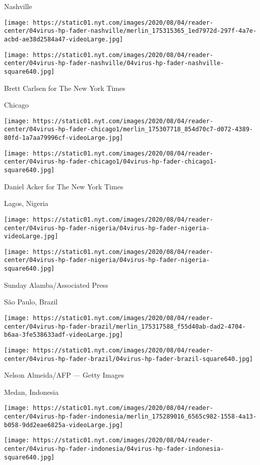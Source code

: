 \href{https://www.nytimes.com/2020/08/04/world/coronavirus-covid-19.html}{}

Nashville

\texttt{[image: https://static01.nyt.com/images/2020/08/04/reader-center/04virus-hp-fader-nashville/merlin\_175315365\_1ed7972d-297f-4a7e-acbd-ae38d2584a47-videoLarge.jpg]}

\texttt{[image: https://static01.nyt.com/images/2020/08/04/reader-center/04virus-hp-fader-nashville/04virus-hp-fader-nashville-square640.jpg]}

 Brett Carlsen for The New York Times

Chicago

\texttt{[image: https://static01.nyt.com/images/2020/08/04/reader-center/04virus-hp-fader-chicago1/merlin\_175307718\_854d70c7-d072-4389-80fd-1a7aa79996cf-videoLarge.jpg]}

\texttt{[image: https://static01.nyt.com/images/2020/08/04/reader-center/04virus-hp-fader-chicago1/04virus-hp-fader-chicago1-square640.jpg]}

 Daniel Acker for The New York Times

Lagos, Nigeria

\texttt{[image: https://static01.nyt.com/images/2020/08/04/reader-center/04virus-hp-fader-nigeria/04virus-hp-fader-nigeria-videoLarge.jpg]}

\texttt{[image: https://static01.nyt.com/images/2020/08/04/reader-center/04virus-hp-fader-nigeria/04virus-hp-fader-nigeria-square640.jpg]}

 Sunday Alamba/Associated Press

São Paulo, Brazil

\texttt{[image: https://static01.nyt.com/images/2020/08/04/reader-center/04virus-hp-fader-brazil/merlin\_175317588\_f55d40ab-dad2-4704-b6aa-3fe538633adf-videoLarge.jpg]}

\texttt{[image: https://static01.nyt.com/images/2020/08/04/reader-center/04virus-hp-fader-brazil/04virus-hp-fader-brazil-square640.jpg]}

 Nelson Almeida/AFP --- Getty Images

Medan, Indonesia

\texttt{[image: https://static01.nyt.com/images/2020/08/04/reader-center/04virus-hp-fader-indonesia/merlin\_175289016\_6565c982-1558-4a13-b058-9dd2eae6825a-videoLarge.jpg]}

\texttt{[image: https://static01.nyt.com/images/2020/08/04/reader-center/04virus-hp-fader-indonesia/04virus-hp-fader-indonesia-square640.jpg]}

